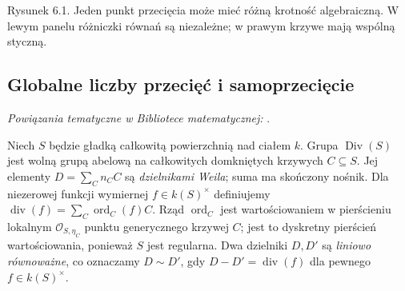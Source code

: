 \begin{center}
\begin{minipage}{\linewidth}
\centering
{}

{\small Rysunek 6.1. Jeden punkt przecięcia może mieć różną krotność algebraiczną. W lewym panelu różniczki równań są niezależne; w prawym krzywe mają wspólną styczną.}\par
\end{minipage}
\end{center}

\subsection{Globalne liczby przecięć i samoprzecięcie}

\noindent\emph{Powiązania tematyczne w Bibliotece matematycznej:} .


\begin{definicja}
\label{def:ga6-divisor-group}
Niech $S$ będzie gładką całkowitą powierzchnią nad ciałem $k$.
Grupa $\operatorname{Div}(S)$ jest wolną grupą abelową na
całkowitych domkniętych krzywych $C\subseteq S$. Jej elementy
$D=\sum_C n_C C$ są \emph{dzielnikami Weila}; suma ma skończony
nośnik. Dla niezerowej funkcji wymiernej $f\in k(S)^\times$
definiujemy $\operatorname{div}(f)=\sum_C\operatorname{ord}_C(f)C$.
Rząd $\operatorname{ord}_C$ jest wartościowaniem w pierścieniu lokalnym
$\mathcal O_{S,\eta_C}$ punktu generycznego krzywej $C$;
jest to dyskretny pierścień wartościowania, ponieważ $S$ jest
regularna. Dwa dzielniki $D,D'$ są \emph{liniowo równoważne},
co oznaczamy $D\sim D'$, gdy $D-D'=\operatorname{div}(f)$
dla pewnego $f\in k(S)^\times$.
\end{definicja}

